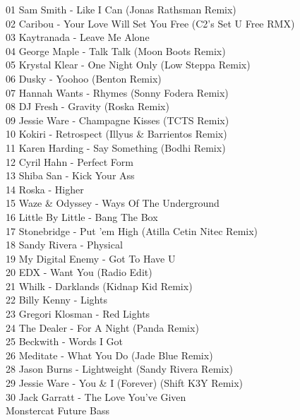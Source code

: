 \begin{multicols}{2}
 01 Sam Smith - Like I Can (Jonas Rathsman Remix)\\ 02 Caribou - Your Love Will Set You Free (C2's Set U Free RMX)\\ 03 Kaytranada - Leave Me Alone\\ 04 George Maple - Talk Talk (Moon Boots Remix)\\ 05 Krystal Klear - One Night Only (Low Steppa Remix)\\ 06 Dusky - Yoohoo (Benton Remix)\\ 07 Hannah Wants - Rhymes (Sonny Fodera Remix)\\ 08 DJ Fresh - Gravity (Roska Remix)\\ 09 Jessie Ware - Champagne Kisses (TCTS Remix)\\ 10 Kokiri - Retrospect (Illyus \& Barrientos Remix)\\ 11 Karen Harding - Say Something (Bodhi Remix)\\ 12 Cyril Hahn - Perfect Form\\ 13 Shiba San - Kick Your Ass\\ 14 Roska - Higher\\ 15 Waze \& Odyssey - Ways Of The Underground\\ 16 Little By Little - Bang The Box\\ 17 Stonebridge - Put 'em High (Atilla Cetin Nitec Remix)\\ 18 Sandy Rivera - Physical\\ 19 My Digital Enemy - Got To Have U\\ 20 EDX - Want You (Radio Edit)\\ 21 Whilk - Darklands (Kidnap Kid Remix)\\ 22 Billy Kenny - Lights\\ 23 Gregori Klosman - Red Lights\\ 24 The Dealer - For A Night (Panda Remix)\\ 25 Beckwith - Words I Got\\ 26 Meditate - What You Do (Jade Blue Remix)\\ 28 Jason Burns - Lightweight (Sandy Rivera Remix)\\ 29 Jessie Ware - You \& I (Forever) (Shift K3Y Remix)\\ 30 Jack Garratt - The Love You've Given\\
 \large Monstercat Future Bass \normalsize\\

\end{multicols}
